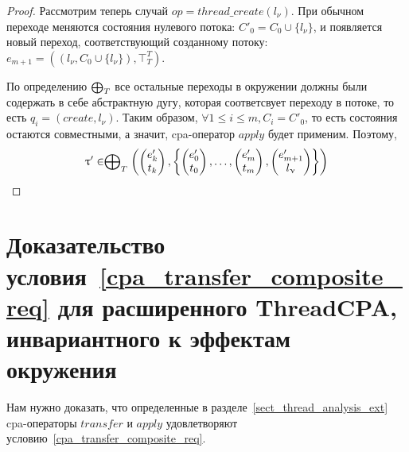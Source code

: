 \begin{proof}
Рассмотрим теперь случай $op = thread\_create(l_{\nu})$.
При обычном переходе меняются состояния нулевого потока: $C'_0 = C_0 \cup \{l_{\nu}\}$, и появляется новый переход, соответствующий созданному потоку: $e_{m+1} = ((l_{\nu},C_0 \cup \{l_{\nu}\}) , \top^T_T)$.

По определению $\mathrel{\bigoplus}_T$ все остальные переходы в окружении должны были содержать в себе абстрактную дугу, которая соответсвует переходу в потоке, то есть $q_i = (create, l_{\nu})$.
Таким образом, $\forall 1 \le i \le m, C_i = C'_0$, то есть состояния остаются совместными, а значит, cpa-оператор $apply$ будет применим.
Поэтому, 
$$\uptau' \in  \mathrel{\bigoplus}_{T}
\left(
\begin{pmatrix}
e'_k \\
t_k 
\end{pmatrix},
\left\{
\begin{pmatrix}
e'_0 \\
t_0 
\end{pmatrix},
\dots ,
\begin{pmatrix}
e'_m \\
t_m 
\end{pmatrix} ,
\begin{pmatrix}
e'_{m+1} \\
l_{\upnu} 
\end{pmatrix}
\right\}
\right)$$

\end{proof}


\section{Доказательство условия~\ref{cpa_transfer_composite_req} для расширенного ThreadCPA, инвариантного к эффектам окружения}
\label{sect_transfer_thread_ext_proof}

Нам нужно доказать, что определенные в разделе~\ref{sect_thread_analysis_ext} cpa-операторы $transfer$ и $apply$ удовлетворяют условию~\ref{cpa_transfer_composite_req}.

